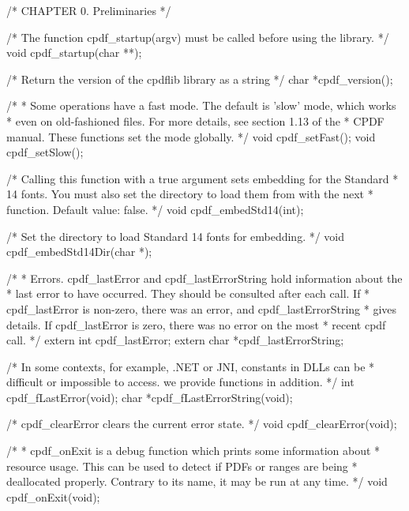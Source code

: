 /* CHAPTER 0. Preliminaries */

/* The function cpdf_startup(argv) must be called before using the library.  */
void cpdf_startup(char **);

/* Return the version of the cpdflib library as a string */
char *cpdf_version();

/*
 * Some operations have a fast mode. The default is 'slow' mode, which works
 * even on old-fashioned files. For more details, see section 1.13 of the
 * CPDF manual. These functions set the mode globally.
 */
void cpdf_setFast();
void cpdf_setSlow();

/* Calling this function with a true argument sets embedding for the Standard
 * 14 fonts.  You must also set the directory to load them from with the next
 * function. Default value: false. */
void cpdf_embedStd14(int);

/* Set the directory to load Standard 14 fonts for embedding. */
void cpdf_embedStd14Dir(char *);

/*
 * Errors. cpdf_lastError and cpdf_lastErrorString hold information about the
 * last error to have occurred. They should be consulted after each call. If
 * cpdf_lastError is non-zero, there was an error, and cpdf_lastErrorString
 * gives details. If cpdf_lastError is zero, there was no error on the most
 * recent cpdf call.
 */
extern int cpdf_lastError;
extern char *cpdf_lastErrorString;

/* In some contexts, for example, .NET or JNI, constants in DLLs can be
 * difficult or impossible to access. we provide functions in addition. */
int cpdf_fLastError(void);
char *cpdf_fLastErrorString(void);

/* cpdf_clearError clears the current error state. */
void cpdf_clearError(void);

/*
 * cpdf_onExit is a debug function which prints some information about
 * resource usage. This can be used to detect if PDFs or ranges are being
 * deallocated properly. Contrary to its name, it may be run at any time.
 */
void cpdf_onExit(void);

